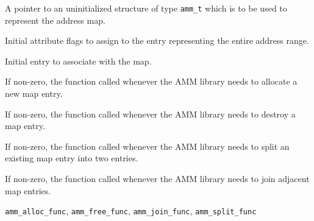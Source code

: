 \begin{apiparm}
	\item[amm]
		A pointer to an uninitialized structure of type {\tt amm_t}
		which is to be used to represent the address map.
	\item[flags]
		Initial attribute flags to assign to the entry representing
		the entire address range.
	\item[entry]
		Initial entry to associate with the map.
	\item[amm_alloc_func]
		If non-zero, the function called whenever the AMM library
		needs to allocate a new map entry.
	\item[amm_free_func]
		If non-zero, the function called whenever the AMM library
		needs to destroy a map entry.
	\item[amm_split_func]
		If non-zero, the function called whenever the AMM library
		needs to split an existing map entry into two entries.
	\item[amm_join_func]
		If non-zero, the function called whenever the AMM library
		needs to join adjacent map entries.
\end{apiparm}
\begin{apirel}
	{\tt amm_alloc_func}, {\tt amm_free_func},
	{\tt amm_join_func}, {\tt amm_split_func}
\end{apirel}


